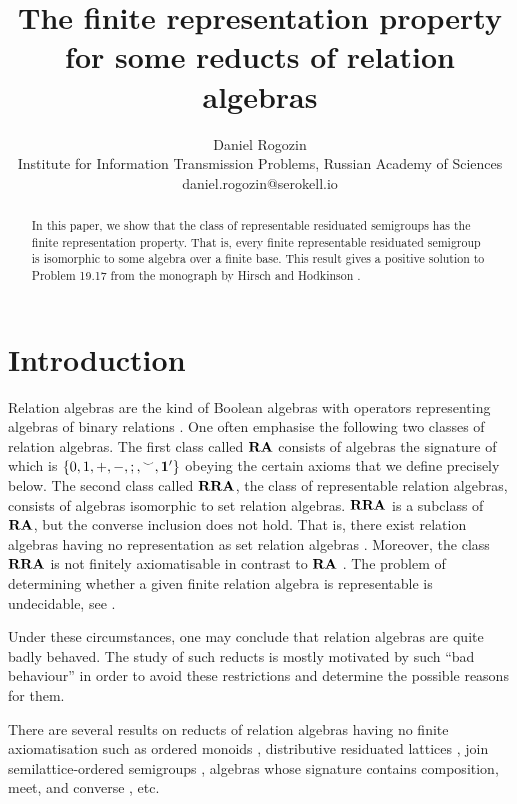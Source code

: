 \documentclass[a4paper]{article}
\author{Daniel Rogozin \\ Institute for Information Transmission Problems, Russian Academy of Sciences \\ daniel.rogozin@serokell.io}
\date{}
\title{The finite representation property for some reducts of relation algebras}
\theoremstyle{definition}
\theoremstyle{theorem}
\theoremstyle{proposition}
\theoremstyle{lemma}
\theoremstyle{ex}
\theoremstyle{corollary}
\theoremstyle{claim}
\begin{document}
\maketitle

\begin{abstract}
In this paper, we show that the class of representable residuated semigroups has the finite representation property. That is, every finite representable residuated semigroup is isomorphic to some algebra over a finite base. This result gives a positive solution to Problem 19.17 from the monograph by Hirsch and Hodkinson \cite{hirsch2002relation}.
\end{abstract}

\section{Introduction}

Relation algebras are the kind of Boolean algebras with operators representing algebras of binary relations \cite{jonsson1951boolean}. One often emphasise the following two classes of relation algebras.
The first class called ${\bf RA}$ consists of algebras the signature of which is $\{ 0, 1, +, -, ;, {}^{\smile}, {\bf 1}' \}$ obeying the certain axioms that we define precisely below.
The second class called ${\bf RRA}$, the class of representable relation algebras, consists of algebras isomorphic to set relation algebras. ${\bf RRA}$ is a subclass of ${\bf RA}$, but the converse inclusion does not hold. That is, there exist relation algebras having no representation as set relation algebras \cite{lyndon1950representation}. Moreover, the class ${\bf RRA}$ is not finitely axiomatisable in contrast to ${\bf RA}$ \cite{monk1964representable}. The problem of determining whether a given finite relation algebra is representable is undecidable, see \cite{hirsch2001representability}.

Under these circumstances, one may conclude that relation algebras are quite badly behaved. The study of such reducts is mostly motivated by such ``bad behaviour'' in order to avoid these restrictions and determine the possible reasons for them.

There are several results on reducts of relation algebras having no finite axiomatisation such as ordered monoids \cite{hirsch2005class}, distributive residuated lattices \cite{andreka1994lambek}, join semilattice-ordered semigroups \cite{andreka2011axiomatizability}, algebras whose signature contains composition, meet, and converse \cite{hodkinson2000axiomatizability}, etc.
\end{document}
